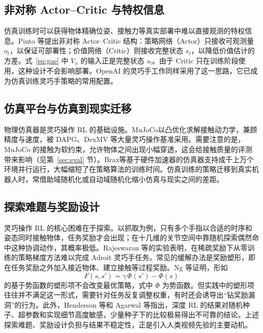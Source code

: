 \documentclass[UTF8,a4paper,zihao=-4]{ctexart}
\begin{document}
\subsection{非对称 Actor–Critic 与特权信息}

仿真训练时可以获得物体精确位姿、接触力等真实部署中难以直接观测的特权信息。Pinto 等\cite{pinto}提出非对称 Actor–Critic 结构：策略网络（Actor）只接收可观测量 $o_t$，以保证可部署性；价值网络（Critic）则接收完整状态 $s_t$，以降低价值估计的方差。式~\eqref{eq:gae} 中 $V_\phi$ 的输入正是完整状态 $s_t$。由于 Critic 只在训练阶段使用，这种设计不会影响部署。OpenAI 的灵巧手工作同样采用了这一思路\cite{openai2018}，它已成为仿真训练灵巧手策略的常用配置。

\subsection{仿真平台与仿真到现实迁移}

物理仿真器是灵巧操作 RL 的基础设施。MuJoCo\cite{mujoco}以凸优化求解接触动力学，兼顾精度与速度，被 DAPG、DexMV 等大量灵巧操作基准采用\cite{dapg,dexmv}。需要注意的是，MuJoCo 的接触为软约束，允许物体之间出现小幅穿透，这会给接触质量的评测带来影响（见第~\ref{sec:eval} 节）。Brax\cite{brax}等基于硬件加速器的仿真器支持成千上万个环境并行运行，大幅缩短了在策略算法的训练时间。仿真训练的策略迁移到真实机器人时，常借助域随机化\cite{tobin2017}或自动域随机化\cite{rubik2019}缩小仿真与现实之间的差距。

\subsection{探索难题与奖励设计}

灵巧操作 RL 的核心困难在于探索。以抓取为例，只有多个手指以合适的时序和姿态同时接触物体，任务奖励才会出现；在十几维的关节空间中靠随机探索偶然命中这种协调动作，其概率极低。Rajeswaran 等\cite{dapg}的实验表明，在稀疏奖励下从零训练的策略梯度方法难以完成 Adroit 灵巧手任务。常见的缓解办法是奖励塑形，即在任务奖励之外加入接近物体、建立接触等过程奖励。Ng 等\cite{ng1999}证明，形如
\begin{equation}\label{eq:shaping}
  F(s,s')=\gamma\,\Phi(s')-\Phi(s)
\end{equation}
的基于势函数的塑形项不会改变最优策略，式中 $\Phi$ 为势函数。但实践中的塑形项往往并不满足这一形式，需要针对任务反复调整权重，有时还会诱导出“钻奖励漏洞”的行为。此外，Henderson 等\cite{henderson2018}和 Agarwal 等\cite{agarwal2021}指出，深度 RL 的结果对随机种子、超参数和实现细节高度敏感，少量种子下的比较极易得出不可靠的结论。上述探索难题、奖励设计负担与结果不稳定性，正是引入人类视频先验的主要动机。
\end{document}
